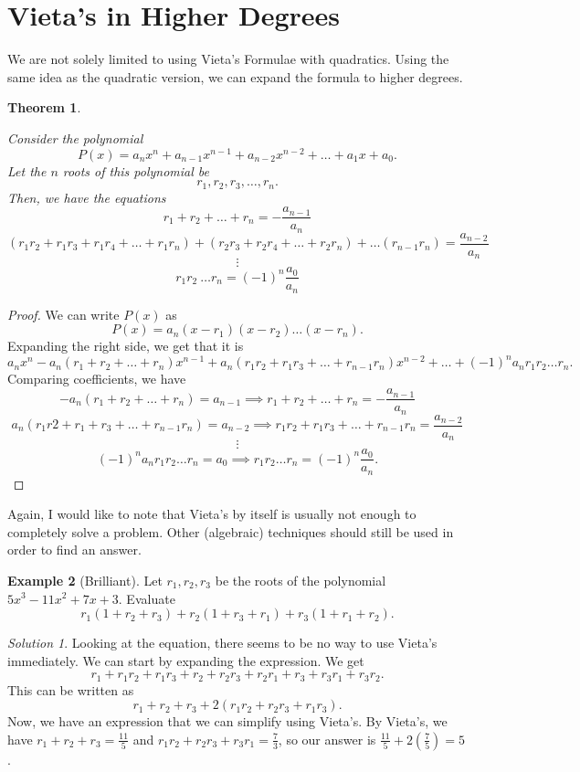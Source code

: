 \documentclass[l1pt]{article}
\theoremstyle{plain}
\newtheorem{thm}{Theorem}[section]
\theoremstyle{definition}
\newtheorem{example}[thm]{Example}
\theoremstyle{remark}
\newtheorem*{solution}{Solution}
\begin{document}
\section{Vieta's in Higher Degrees}

We are not solely limited to using Vieta's Formulae with quadratics. Using the same idea as the quadratic version, we can expand the formula to higher degrees.

\begin{thm}
\begin{mdframed}
Consider the polynomial \[P(x)=a_nx^n+a_{n-1}x^{n-1}+a_{n-2}x^{n-2}+\dots+a_1x+a_0.\] Let the $n$ roots of this polynomial be \[r_1, r_2, r_3, \dots, r_n.\] Then, we have the equations
\[r_1+r_2+\dots+r_n=-\frac{a_{n-1}}{a_n}\]
\[(r_1r_2+r_1r_3+r_1r_4+\dots+r_1r_n)+(r_2r_3+r_2r_4+\dots+r_2r_n)+\dots(r_{n-1}r_n)=\frac{a_{n-2}}{a_n}\] \[\vdots\] \[r_1r_2\ \dots r_n=(-1)^n\frac{a_0}{a_n}\]

\end{mdframed}
\end{thm}

\begin{proof}
We can write $P(x)$ as \[P(x)=a_n(x-r_1)(x-r_2)\dots(x-r_n).\] Expanding the right side, we get that it is
\[a_nx^n-a_n(r_1+r_2+\dots+r_n)x^{n-1}+a_n(r_1r_2+r_1r_3+\dots+r_{n-1}r_n)x^{n-2}+\dots+(-1)^na_nr_1r_2\dots r_n.\] Comparing coefficients, we have
\[-a_n(r_1+r_2+\dots+r_n)=a_{n-1} \implies r_1+r_2+\dots+r_n=-\frac{a_{n-1}}{a_n}\]
\[a_n(r_1r2+r_1+r_3+\dots+r_{n-1}r_n)=a_{n-2} \implies r_1r_2+r_1r_3+\dots+r_{n-1}r_n=\frac{a_{n-2}}{a_n}\]
\[\vdots\]
\[(-1)^na_nr_1r_2\dots r_n=a_0 \implies r_1r_2\dots r_n=(-1)^n\frac{a_0}{a_n}.\]
\end{proof}

Again, I would like to note that Vieta's by itself is usually not enough to completely solve a problem. Other (algebraic) techniques should still be used in order to find an answer.

\begin{example}[Brilliant]
Let $r_1, r_2, r_3$ be the roots of the polynomial $5x^3-11x^2+7x+3.$ Evaluate
\[r_1(1+r_2+r_3)+r_2(1+r_3+r_1)+r_3(1+r_1+r_2).\]
\end{example}

\begin{solution}
Looking at the equation, there seems to be no way to use Vieta's immediately. We can start by expanding the expression. We get \[r_1+r_1r_2+r_1r_3+r_2+r_2r_3+r_2r_1+r_3+r_3r_1+r_3r_2.\] This can be written as \[r_1+r_2+r_3+2(r_1r_2+r_2r_3+r_1r_3).\] Now, we have an expression that we can simplify using Vieta's. By Vieta's, we have $r_1+r_2+r_3=\frac{11}{5}$ and $r_1r_2+r_2r_3+r_3r_1=\frac{7}{3}$, so our answer is $\frac{11}{5}+2(\frac{7}{5})=5$.
 \end{solution}
\end{document}
